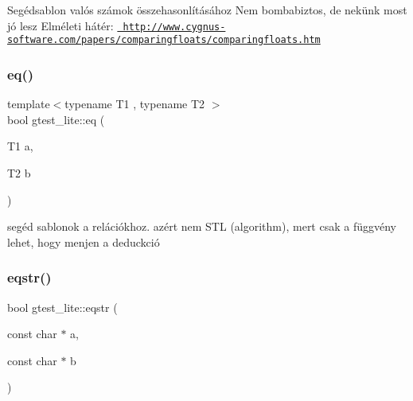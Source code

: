 Segédsablon valós számok összehasonlításához Nem bombabiztos, de nekünk most jó lesz Elméleti hátér\+: \href{http://www.cygnus-software.com/papers/comparingfloats/comparingfloats.htm}{\texttt{ http\+://www.\+cygnus-\/software.\+com/papers/comparingfloats/comparingfloats.\+htm}} \mbox{\label{namespacegtest__lite_a884f0c7c25d80d78a73c759a8fc43a3d}} 
\subsubsection{\texorpdfstring{eq()}{eq()}}
{\footnotesize\ttfamily template$<$typename T1 , typename T2 $>$ \\
bool gtest\+\_\+lite\+::eq (\begin{DoxyParamCaption}\item[{T1}]{a,  }\item[{T2}]{b }\end{DoxyParamCaption})}

segéd sablonok a relációkhoz. azért nem S\+TL (algorithm), mert csak a függvény lehet, hogy menjen a deduckció \mbox{\label{namespacegtest__lite_a34055f353dabbe4ed9063f1d36af6022}} 
\subsubsection{\texorpdfstring{eqstr()}{eqstr()}}
{\footnotesize\ttfamily bool gtest\+\_\+lite\+::eqstr (\begin{DoxyParamCaption}\item[{const char $\ast$}]{a,  }\item[{const char $\ast$}]{b }\end{DoxyParamCaption})\hspace{0.3cm}{\ttfamily [inline]}}

\mbox{\label{namespacegtest__lite_a73d2ede1d983327aea4fdd5b1d2709ce}} 
